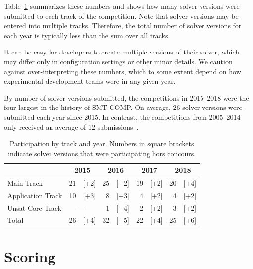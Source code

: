\documentclass[dvipsnames,table,twoside,11pt]{article}
\newcommand{\maintrack}{Main Track\xspace}
\newcommand{\apptrack}{Application Track\xspace}
\newcommand{\ucoretrack}{Unsat-Core Track\xspace}
\begin{document}
Table~\ref{table:participation-by-track} summarizes these numbers and
shows how many solver versions were submitted to each track of the
competition.  Note that solver versions may be entered into multiple
tracks.  Therefore, the total number of solver versions for each year
is typically less than the sum over all tracks.

It can be easy for developers to create multiple versions of their
solver, which may differ only in configuration settings or other minor
details.  We caution against over-interpreting these numbers, which to
some extent depend on how experimental development teams were in any
given year.

By number of solver versions submitted, the competitions in 2015--2018
were the four largest in the history of SMT-COMP.  On average, 26
solver versions were submitted each year since 2015.  In contrast, the
competitions from 2005--2014 only received an average of 12
submissions~\cite{CDW14}.

\begin{table}
  \caption{Participation by track and year.  Numbers in square
    brackets indicate solver versions that were participating hors
    concours.}
  \label{table:participation-by-track}
  \centering
  \begin{tabular}{lr@{\,\,}rr@{\,\,}rr@{\,\,}rr@{\,\,}r}
    \toprule
                      & \multicolumn{2}{c}{2015} & \multicolumn{2}{c}{2016} & \multicolumn{2}{c}{2017} & \multicolumn{2}{c}{2018} \\
    \midrule
    \maintrack   & 21 &               [+2] & 25 & [+2] & 19 & [+2] & 20 & [+4] \\
    \apptrack    & 10 &               [+3] &  8 & [+3] &  4 & [+2] &  4 & [+2] \\
    \ucoretrack  & \multicolumn{2}{c}{---} &  1 & [+4] &  2 & [+2] &  3 & [+2] \\
    \midrule
    Total             & 26 &               [+4] & 32 & [+5] & 22 & [+4] & 25 & [+6] \\
    \bottomrule
  \end{tabular}
\end{table}


\section{Scoring}
\label{sec:scoring}
\end{document}
